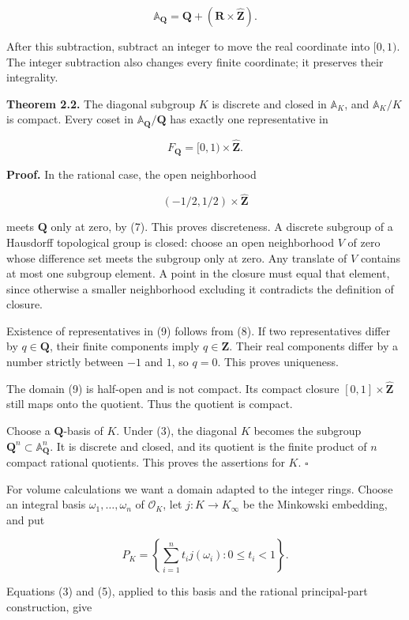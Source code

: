 \documentclass[
  english,
  11pt,
  a4paper,
]{article}
\begin{document}
\[\mathbb A_{\mathbf Q}
=\mathbf Q+(\mathbf R\times\widehat{\mathbf Z}).
\tag{8}\]

After this subtraction, subtract an integer to move the real coordinate
into \([0,1)\). The integer subtraction also changes every finite
coordinate; it preserves their integrality.

\textbf{Theorem 2.2.} The diagonal subgroup \(K\) is discrete and closed
in \(\mathbb A_K\), and \(\mathbb A_K/K\) is compact. Every coset in
\(\mathbb A_{\mathbf Q}/\mathbf Q\) has exactly one representative in

\[F_{\mathbf Q}=[0,1)\times\widehat{\mathbf Z}.
\tag{9}\]

\textbf{Proof.} In the rational case, the open neighborhood

\[(-1/2,1/2)\times\widehat{\mathbf Z}\]

meets \(\mathbf Q\) only at zero, by (7). This proves discreteness. A
discrete subgroup of a Hausdorff topological group is closed: choose an
open neighborhood \(V\) of zero whose difference set meets the subgroup
only at zero. Any translate of \(V\) contains at most one subgroup
element. A point in the closure must equal that element, since otherwise
a smaller neighborhood excluding it contradicts the definition of
closure.

Existence of representatives in (9) follows from (8). If two
representatives differ by \(q\in\mathbf Q\), their finite components
imply \(q\in\mathbf Z\). Their real components differ by a number
strictly between \(-1\) and \(1\), so \(q=0\). This proves uniqueness.

The domain (9) is half-open and is not compact. Its compact closure
\([0,1]\times\widehat{\mathbf Z}\) still maps onto the quotient. Thus
the quotient is compact.

Choose a \(\mathbf Q\)-basis of \(K\). Under (3), the diagonal \(K\)
becomes the subgroup \(\mathbf Q^n\subset\mathbb A_{\mathbf Q}^n\). It
is discrete and closed, and its quotient is the finite product of \(n\)
compact rational quotients. This proves the assertions for \(K\).
\(\square\)

For volume calculations we want a domain adapted to the integer rings.
Choose an integral basis \(\omega_1,\ldots,\omega_n\) of
\(\mathcal O_K\), let \(j:K\to K_\infty\) be the Minkowski embedding,
and put

\[P_K=\left\{\sum_{i=1}^n t_i j(\omega_i):0\leq t_i<1\right\}.\]

Equations (3) and (5), applied to this basis and the rational
principal-part construction, give
\end{document}
